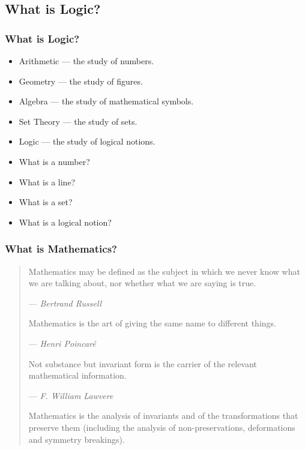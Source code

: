 \documentclass[UTF8,11pt,colorlinks,compress,openany]{beamer}%
\begin{document}
\subsection{What is Logic?}

\begin{frame}\frametitle{What is Logic?}
	\begin{itemize}
		\item Arithmetic --- the study of numbers.
		\item Geometry --- the study of figures.
		\item Algebra --- the study of mathematical symbols.
		\item Set Theory --- the study of sets.
		\item Logic --- the study of logical notions.
	\end{itemize}
	\begin{itemize}
		\item What is a number?
		\item What is a line?
		\item What is a set?
		\item What is a logical notion?
	\end{itemize}
\end{frame}

\begin{frame}\frametitle{What is Mathematics?}
	\begin{quote}
		Mathematics may be defined as the subject in which we never know what we are talking about, nor whether what we are saying is true.\par
		\hfill --- \textsl{Bertrand Russell}

		Mathematics is the art of giving the same name to different things.\par
		\hfill --- \textsl{Henri Poincar\'e}
		
		Not substance but invariant form is the carrier of the relevant mathematical information.\par
		\hfill --- \textsl{F. William Lawvere}

		Mathematics is the analysis of invariants and of the transformations that preserve them (including the analysis of non-preservations, deformations and symmetry breakings).
	\end{quote}
\end{frame}
\end{document}
